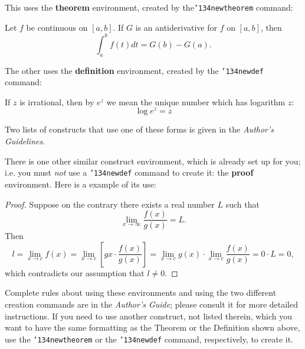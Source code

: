 \documentclass{sig-alternate-05-2015}
\begin{document}
This uses the \textbf{theorem} environment, created by
the\linebreak\texttt{{\char'134}newtheorem} command:
\begin{theorem}
Let $f$ be continuous on $[a,b]$.  If $G$ is
an antiderivative for $f$ on $[a,b]$, then
\begin{displaymath}\int^b_af(t)dt = G(b) - G(a).\end{displaymath}
\end{theorem}

The other uses the \textbf{definition} environment, created
by the \texttt{{\char'134}newdef} command:
\begin{definition}
If $z$ is irrational, then by $e^z$ we mean the
unique number which has
logarithm $z$: \begin{displaymath}{\log e^z = z}\end{displaymath}
\end{definition}

Two lists of constructs that use one of these
forms is given in the
\textit{Author's  Guidelines}.
 
There is one other similar construct environment, which is
already set up
for you; i.e. you must \textit{not} use
a \texttt{{\char'134}newdef} command to
create it: the \textbf{proof} environment.  Here
is a example of its use:
\begin{proof}
Suppose on the contrary there exists a real number $L$ such that
\begin{displaymath}
\lim_{x\rightarrow\infty} \frac{f(x)}{g(x)} = L.
\end{displaymath}
Then
\begin{displaymath}
l=\lim_{x\rightarrow c} f(x)
= \lim_{x\rightarrow c}
\left[ g{x} \cdot \frac{f(x)}{g(x)} \right ]
= \lim_{x\rightarrow c} g(x) \cdot \lim_{x\rightarrow c}
\frac{f(x)}{g(x)} = 0\cdot L = 0,
\end{displaymath}
which contradicts our assumption that $l\neq 0$.
\end{proof}

Complete rules about using these environments and using the
two different creation commands are in the
\textit{Author's Guide}; please consult it for more
detailed instructions.  If you need to use another construct,
not listed therein, which you want to have the same
formatting as the Theorem
or the Definition shown above,
use the \texttt{{\char'134}newtheorem} or the
\texttt{{\char'134}newdef} command,
respectively, to create it.
\end{document}
